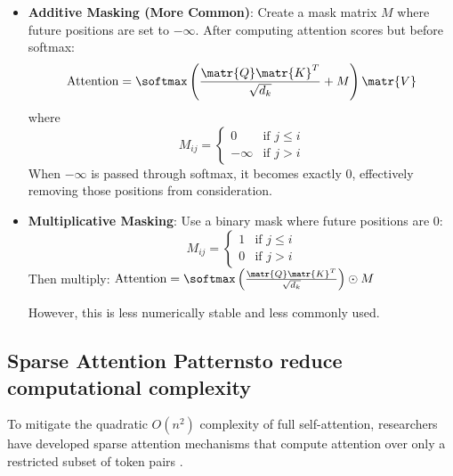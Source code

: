 \begin{itemize}
  \item \textbf{Additive Masking (More Common)}: Create a mask matrix $M$ where future positions are set to $-\infty$. After computing attention scores but before softmax:
    \[
      \text{Attention} = \softmax\left(\frac{\matr{Q}\matr{K}^T}{\sqrt{d_k}} + M\right)\matr{V}
    \]
    where
    \[
      M_{ij} =
      \begin{cases}
        0 & \text{if } j \leq i \\
        -\infty & \text{if } j > i
      \end{cases}
    \]
    When $-\infty$ is passed through softmax, it becomes exactly 0, effectively removing those positions from consideration.

  \item \textbf{Multiplicative Masking}: Use a binary mask where future positions are 0:
    \[
      M_{ij} =
      \begin{cases}
        1 & \text{if } j \leq i \\
        0 & \text{if } j > i
      \end{cases}
    \]
    Then multiply: $\text{Attention} = \softmax\left(\frac{\matr{Q}\matr{K}^T}{\sqrt{d_k}}\right) \odot M$

    However, this is less numerically stable and less commonly used.
\end{itemize}

\subsection{Sparse Attention Patternsto reduce computational complexity}

To mitigate the quadratic $O(n^2)$ complexity of full self-attention, researchers have developed sparse attention mechanisms \cite{Child2019} that compute attention over only a restricted subset of token pairs \cite{zhang2025spargeattn}.

